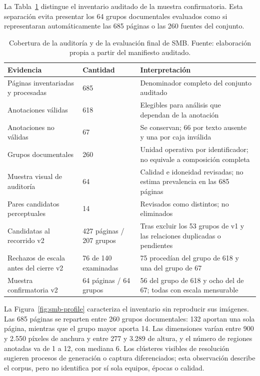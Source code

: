 La Tabla~\ref{tab:smb-audit-summary} distingue el inventario auditado de la muestra confirmatoria.
Esta separación evita presentar los 64 grupos documentales evaluados como si representaran automáticamente las
685 páginas o las 260 fuentes del conjunto.

\begin{table}[htbp]
  \centering
  \small
  \setlength{\tabcolsep}{3pt}
  \caption{Cobertura de la auditoría y de la evaluación final de SMB. Fuente: elaboración propia a
  partir del manifiesto auditado.}
  \label{tab:smb-audit-summary}
  \begin{tabular}{p{}p{}p{}}
    \toprule
    Evidencia & Cantidad & Interpretación \\
    \midrule
    Páginas inventariadas y procesadas & 685 & Denominador completo del conjunto auditado \\
    Anotaciones válidas & 618 & Elegibles para análisis que dependan de la anotación \\
    Anotaciones no válidas & 67 & Se conservan; 66 por texto ausente y una por caja inválida \\
    Grupos documentales & 260 & Unidad operativa por identificador; no equivale a composición completa \\
    Muestra visual de auditoría & 64 & Calidad e idoneidad revisadas; no estima prevalencia en las 685 páginas \\
    Pares candidatos perceptuales & 14 & Revisados como distintos; no eliminados \\
    Candidatas al recorrido v2 & 427 páginas / 207 grupos & Tras excluir los 53 grupos de v1 y las relaciones duplicadas o pendientes \\
    Rechazos de escala antes del cierre v2 & 76 de 140 examinadas & 75 procedían del grupo de 618 y una del grupo de 67 \\
    Muestra confirmatoria v2 & 64 páginas / 64 grupos & 56 del grupo de 618 y ocho del de 67; todas con escala mensurable \\
    \bottomrule
  \end{tabular}
\end{table}

La Figura~\ref{fig:smb-profile} caracteriza el inventario sin reproducir sus imágenes. Las 685
páginas se reparten entre 260 grupos documentales: 132 aportan una sola página, mientras que el grupo mayor aporta
14. Las dimensiones varían entre 900 y 2.550 píxeles de anchura y entre 277 y 3.289 de altura, y el
número de regiones anotadas va de 1 a 12, con mediana 6. Los clústeres visibles de resolución
sugieren procesos de generación o captura diferenciados; esta observación describe el corpus, pero
no identifica por sí sola equipos, épocas o calidad.

